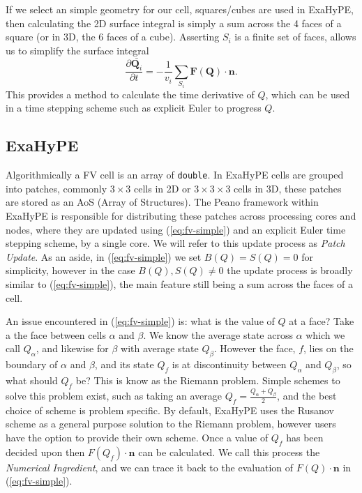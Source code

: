 If we select an simple geometry for our cell, squares/cubes are used in ExaHyPE, then calculating the 2D surface integral is simply a sum across the 4 faces of a square (or in 3D, the 6 faces of a cube).
Asserting $S_i$ is a finite set of faces, allows us to simplify the surface integral
\begin{equation}\label{eq:fv-simple}
   \frac{\partial \bar{\mathbf{Q}_i}}{\partial t} = -\frac{1}{v_i} \sum_{S_i}\mathbf{F}(\mathbf{Q})\cdot \mathbf{n}.
\end{equation}
This provides a method to calculate the time derivative of $Q$, which can be used in a time stepping scheme such as explicit Euler to progress $Q$.


\subsection{ExaHyPE}
\newcommand{\proc}[1]{\textit{#1}}
Algorithmically a FV cell is an array of \lstinline{double}.
In ExaHyPE cells are grouped into patches, commonly $3\times 3$ cells in 2D or $3\times 3 \times 3$ cells in 3D, these patches are stored as an AoS (Array of Structures).
The Peano framework within ExaHyPE is responsible for distributing these patches across processing cores and nodes, where they are updated using (\ref{eq:fv-simple}) and an explicit Euler time stepping scheme, by a single core.
We will refer to this update process as \proc{Patch Update}.
As an aside, in (\ref{eq:fv-simple}) we set $B(Q)=S(Q)=0$ for simplicity, however in the case $B(Q), S(Q)\neq 0$ the update process is broadly similar to (\ref{eq:fv-simple}), the main feature still being a sum across the faces of a cell.

An issue encountered in (\ref{eq:fv-simple}) is: what is the value of $Q$ at a face?
Take a the face between cells $\alpha$ and $\beta$.
We know the average state across $\alpha$ which we call $Q_\alpha$, and likewise for $\beta$ with average state $Q_\beta$.
However the face, $f$, lies on the boundary of $\alpha$ and $\beta$, and its state $Q_f$ is at discontinuity between $Q_\alpha$ and $Q_\beta$, so what should $Q_f$ be?
This is know as the Riemann problem.
Simple schemes to solve this problem exist, such as taking an average $Q_f = \frac{Q_\alpha + Q_\beta}{2}$, and the best choice of scheme is problem specific.
By default, ExaHyPE uses the Rusanov scheme \cite{rusanov} as a general purpose solution to the Riemann problem, however users have the option to provide their own scheme.
Once a value of $Q_f$ has been decided upon then $F(Q_f)\cdot \mathbf{n}$ can be calculated.
We call this process the \proc{Numerical Ingredient}, and we can trace it back to the evaluation of $F(Q)\cdot\mathbf{n}$ in (\ref{eq:fv-simple}).

